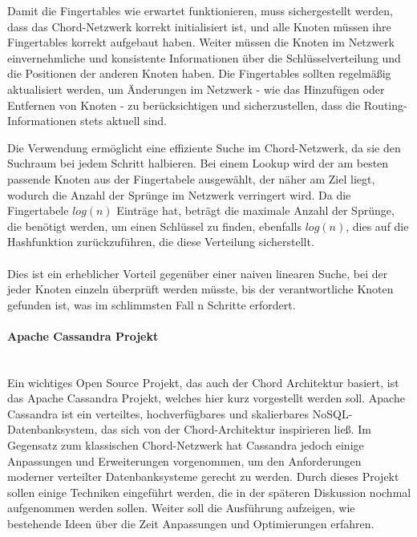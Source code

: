\documentclass[../vs-script-first-v01.tex]{subfiles}
\begin{document}
Damit die Fingertables wie erwartet funktionieren, muss sichergestellt werden, dass das Chord-Netzwerk  korrekt initialisiert ist, und alle Knoten müssen ihre Fingertables korrekt aufgebaut haben. Weiter müssen die Knoten im Netzwerk einvernehmliche und konsistente Informationen über die Schlüsselverteilung und die Positionen der anderen Knoten haben. Die Fingertables sollten regelmäßig aktualisiert werden, um Änderungen im Netzwerk - wie das Hinzufügen oder Entfernen von Knoten - zu berücksichtigen und sicherzustellen, dass die Routing-Informationen stets aktuell sind.

Die Verwendung ermöglicht eine effiziente Suche im Chord-Netzwerk, da sie den Suchraum bei jedem Schritt halbieren. Bei einem Lookup wird der am besten passende Knoten aus der Fingertabele ausgewählt, der näher am Ziel liegt, wodurch die Anzahl der Sprünge im Netzwerk verringert wird. Da die Fingertabele $log(n)$ Einträge hat, beträgt die maximale Anzahl der Sprünge, die benötigt werden, um einen Schlüssel zu finden, ebenfalls $log(n)$, dies auf die Hashfunktion zurückzuführen, die diese Verteilung sicherstellt. 
\\\\
Dies ist ein erheblicher Vorteil gegenüber einer naiven linearen Suche, bei der jeder Knoten einzeln überprüft werden müsste, bis der verantwortliche Knoten gefunden ist, was im schlimmsten Fall n Schritte erfordert.

\paragraph{Apache Cassandra Projekt\\\\}
Ein wichtiges Open Source Projekt, das auch der Chord Architektur basiert, ist das Apache Cassandra Projekt, welches hier kurz vorgestellt werden soll. Apache Cassandra ist ein verteiltes, hochverfügbares und skalierbares NoSQL-Datenbanksystem, das sich von der Chord-Architektur inspirieren ließ. Im Gegensatz zum klassischen Chord-Netzwerk hat Cassandra jedoch einige Anpassungen und Erweiterungen vorgenommen, um den Anforderungen moderner verteilter Datenbanksysteme gerecht zu werden. Durch dieses Projekt sollen einige Techniken eingeführt werden, die in der späteren Diskussion nochmal aufgenommen werden sollen. Weiter soll die Ausführung aufzeigen, wie bestehende Ideen über die Zeit Anpassungen und Optimierungen erfahren.
\end{document}
